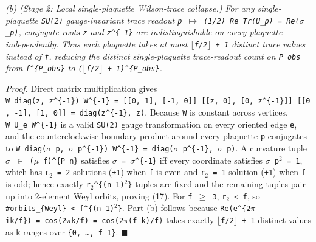 \documentclass[
  american,
  11pt,
  letterpaper,
]{article}
\begin{document}
\emph{(b) (Stage 2: Local single-plaquette Wilson-trace collapse.) For any single-plaquette \texttt{SU(2)} gauge-invariant trace readout \texttt{p\ \ensuremath{\mapsto}\ (1/2)\ Re\ Tr(U\_p)\ =\ Re(\ensuremath{\sigma}\_p)}, conjugate roots \texttt{z} and \texttt{z\^{}\{-1\}} are indistinguishable on every plaquette independently. Thus each plaquette takes at most \texttt{\ensuremath{\lfloor}f/2\ensuremath{\rfloor}\ +\ 1} distinct trace values instead of \texttt{f}, reducing the distinct single-plaquette trace-readout count on \texttt{P\_obs} from \texttt{f\^{}\{\textbar{}P\_obs\textbar{}\}} to \texttt{(\ensuremath{\lfloor}f/2\ensuremath{\rfloor}\ +\ 1)\^{}\{\textbar{}P\_obs\textbar{}\}}.}

\emph{Proof.} Direct matrix multiplication gives \texttt{W\ diag(z,\ z\^{}\{-1\})\ W\^{}\{-1\}\ =\ {[}{[}0,\ 1{]},\ {[}-1,\ 0{]}{]}\ {[}{[}z,\ 0{]},\ {[}0,\ z\^{}\{-1\}{]}{]}\ {[}{[}0,\ -1{]},\ {[}1,\ 0{]}{]}\ =\ diag(z\^{}\{-1\},\ z)}. Because \texttt{W} is constant across vertices, \texttt{W\ U\_e\ W\^{}\{-1\}} is a valid \texttt{SU(2)} gauge transformation on every oriented edge \texttt{e}, and the counterclockwise boundary product around every plaquette \texttt{p} conjugates to \texttt{W\ diag(\ensuremath{\sigma}\_p,\ \ensuremath{\sigma}\_p\^{}\{-1\})\ W\^{}\{-1\}\ =\ diag(\ensuremath{\sigma}\_p\^{}\{-1\},\ \ensuremath{\sigma}\_p)}. A curvature tuple \texttt{\ensuremath{\sigma}\ \ensuremath{\in}\ (\ensuremath{\mu}\_f)\^{}\{P\_n\}} satisfies \texttt{\ensuremath{\sigma}\ =\ \ensuremath{\sigma}\^{}\{-1\}} iff every coordinate satisfies \texttt{\ensuremath{\sigma}\_p\ensuremath{{}^{2}}\ =\ 1}, which has \texttt{r\ensuremath{{}_{2}}\ =\ 2} solutions (\texttt{±1}) when \texttt{f} is even and \texttt{r\ensuremath{{}_{2}}\ =\ 1} solution (\texttt{+1}) when \texttt{f} is odd; hence exactly \texttt{r\ensuremath{{}_{2}}\^{}\{(n-1)\ensuremath{{}^{2}}\}} tuples are fixed and the remaining tuples pair up into 2-element Weyl orbits, proving (17). For \texttt{f\ \ensuremath{\geq}\ 3}, \texttt{r\ensuremath{{}_{2}}\ \textless{}\ f}, so \texttt{\#orbits\_\{Weyl\}\ \textless{}\ f\^{}\{(n-1)\ensuremath{{}^{2}}\}}. Part (b) follows because \texttt{Re(e\^{}\{2\ensuremath{\pi}ik/f\})\ =\ cos(2\ensuremath{\pi}k/f)\ =\ cos(2\ensuremath{\pi}(f-k)/f)} takes exactly \texttt{\ensuremath{\lfloor}f/2\ensuremath{\rfloor}\ +\ 1} distinct values as \texttt{k} ranges over \texttt{\{0,\ …,\ f-1\}}. \ensuremath{\blacksquare}
\end{document}
